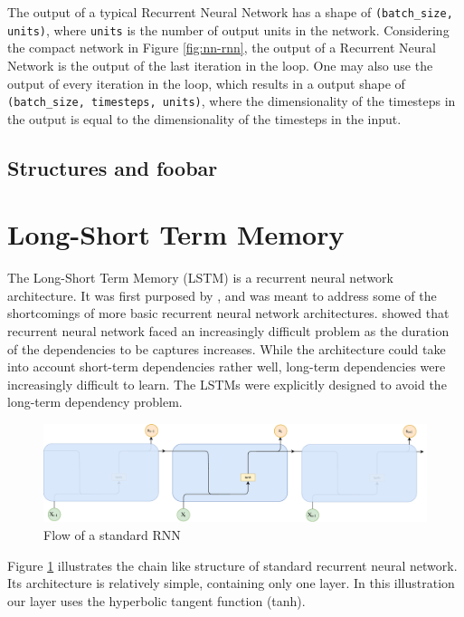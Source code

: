 The output of a typical Recurrent Neural Network has a shape of {\tt (batch\_size, units)}, where {\tt units} is the number of output units in the network. Considering the compact network in Figure \ref{fig:nn-rnn}, the output of a Recurrent Neural Network is the output of the last iteration in the loop. One may also use the output of every iteration in the loop, which results in a output shape of {\tt (batch\_size, timesteps, units)}, where the dimensionality of the timesteps in the output is equal to the dimensionality of the timesteps in the input.

\subsection{Structures and foobar}


\section{Long-Short Term Memory}
\label{sec:long_short_term_memory}
The Long-Short Term Memory (LSTM) is a recurrent neural network architecture. It was first purposed by \citep{hochreiter1997long}, and was meant to address some of the shortcomings of more basic recurrent neural network architectures. \citep{bengio1994learning} showed that recurrent neural network faced an increasingly difficult problem as the duration of the dependencies to be captures increases. While the architecture could take into account short-term dependencies rather well, long-term dependencies were increasingly difficult to learn. The LSTMs were explicitly designed to avoid the long-term dependency problem. 

\begin{figure}[ht]
    \centering
    \includegraphics[width=1\textwidth]{fig/related_work/rnn_flow.pdf}
    \caption{Flow of a standard RNN}
    \label{fig:nn-rnn-flow}
\end{figure}

Figure \ref{fig:nn-rnn-flow} illustrates the chain like structure of standard recurrent neural network. Its architecture is relatively simple, containing only one layer. In this illustration our layer uses the hyperbolic tangent function (tanh).

